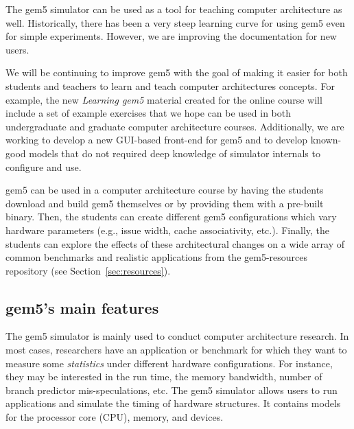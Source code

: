 The gem5 simulator can be used as a tool for teaching computer architecture as well.
Historically, there has been a very steep learning curve for using gem5 even for simple experiments.
However, we are improving the documentation for new users.

We will be continuing to improve gem5 with the goal of making it easier for both students and teachers to learn and teach computer architectures concepts.
For example, the new \emph{Learning gem5} material created for the online course will include a set of example exercises that we hope can be used in both undergraduate and graduate computer architecture courses.
Additionally, we are working to develop a new GUI-based front-end for gem5 and to develop known-good models that do not required deep knowledge of simulator internals to configure and use.

gem5 can be used in a computer architecture course by having the students download and build gem5 themselves or by providing them with a pre-built binary.
Then, the students can create different gem5 configurations which vary hardware parameters (e.g., issue width, cache associativity, etc.).
Finally, the students can explore the effects of these architectural changes on a wide array of common benchmarks and realistic applications from the gem5-resources repository (see Section~\ref{sec:resources}).

\subsection{gem5's main features}
\label{sec:main-features}

The gem5 simulator is mainly used to conduct computer architecture research.
In most cases, researchers have an application or benchmark for which they want to measure some \emph{statistics} under different hardware configurations.
For instance, they may be interested in the run time, the memory bandwidth, number of branch predictor mis-speculations, etc.
The gem5 simulator allows users to run applications and simulate the timing of hardware structures.
It contains models for the processor core (CPU), memory, and devices.

